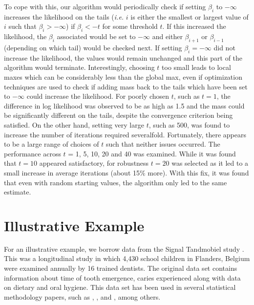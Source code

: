 	To cope with this, our algorithm would periodically check if setting $\beta_i$ to $-\infty$ increases the likelihood on the tails (\emph{i.e.} $i$ is either the smallest or largest value of $i$ such that $\beta_i > -\infty$) if $\beta_i < -t$ for some threshold $t$. If this increased the likelihood, the $\beta_i$ associated would be set to $-\infty$ and either $\beta_{i+1}$ or $\beta_{i-1}$ (depending on which tail) would be checked next. If setting $\beta_i = -\infty$ did not increase the likelihood, the values would remain unchanged and this part of the algorithm would terminate. Interestingly, choosing $t$ too small leads to local maxes which can be considerably less than the global max, even if optimization techniques are used to check if adding mass back to the tails which have been set to $-\infty$ could increase the likelihood. For poorly chosen $t$, such as $t = 1$, the difference in log likelihood was observed to be as high as 1.5 and the mass could be significantly different on the tails, despite the convergence criterion being satisfied. On the other hand, setting very large $t$, such as 500, was found to increase the number of iterations required severalfold. Fortunately, there appears to be a large range of choices of $t$ such that neither issues occurred. The performance across $t$ = 1, 5, 10, 20 and 40 was examined. While it was found that $t = 10$ appeared satisfactory, for robustness $t = 20$ was selected as it led to a small increase in average iterations (about 15\% more). With this fix, it was found that even with random starting values, the algorithm only led to the same estimate. 
\\

	{\section{Illustrative Example} 
	\label{sec:ME}	}
	
		For an illustrative example, we borrow data from the Signal Tandmobiel {\textregistered} study \cite{RefVan2000}. This was a longitudinal study in which 4,430 school children in Flanders, Belgium were examined annually by 16 trained dentists. The original data set contains information about time of tooth emergence, caries experienced along with data on dietary and oral hygiene. This data set has been used in several statistical methodology papers, such as \cite{RefBogLes2004}, \cite{RefKL2006}, \cite{RefLKD2005} and \cite{RefGCOL2009}, among others.

